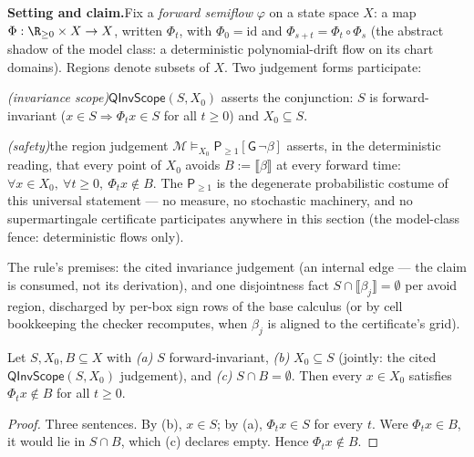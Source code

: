 

\textbf{Setting and claim.}\enspace Fix a \emph{forward semiflow} $\varphi$
on a state space $X$: a map $\Phi : \R_{\geq 0} \times X \to X$, written
$\Phi_t$, with $\Phi_0 = \mathrm{id}$ and $\Phi_{s+t} = \Phi_t \circ
\Phi_s$ (the abstract shadow of the model class: a deterministic
polynomial-drift flow on its chart domains). Regions denote subsets of
$X$. Two judgement forms participate:

\emph{(invariance scope)}\enspace $\mathsf{QInvScope}(S, X_0)$ asserts the
conjunction: $S$ is forward-invariant ($x \in S \Rightarrow \Phi_t x \in S$
for all $t \geq 0$) and $X_0 \subseteq S$.

\emph{(safety)}\enspace the region judgement
$\mathcal{M} \vDash_{X_0} \mathsf{P}_{\geq 1}[\mathsf{G}\,\neg\beta]$
asserts, in the deterministic reading, that every point of $X_0$ avoids
$B := \llbracket\beta\rrbracket$ at every forward time:
$\forall x \in X_0,\ \forall t \geq 0,\ \Phi_t x \notin B$. The
$\mathsf{P}_{\geq 1}$ is the degenerate probabilistic costume of this
universal statement --- no measure, no stochastic machinery, and no
supermartingale certificate participates anywhere in this section (the
model-class fence: deterministic flows only).

The rule's premises: the cited invariance judgement (an internal edge ---
the claim is consumed, not its derivation), and one disjointness fact
$S \cap \llbracket\beta_j\rrbracket = \emptyset$ per avoid region,
discharged by per-box sign rows of the base calculus (or by cell
bookkeeping the checker recomputes, when $\beta_j$ is aligned to the
certificate's grid).

\begin{bthm}\label{thm:qbasin-sound}
Let $S, X_0, B \subseteq X$ with
\emph{(a)} $S$ forward-invariant,
\emph{(b)} $X_0 \subseteq S$
(jointly: the cited $\mathsf{QInvScope}(S, X_0)$ judgement), and
\emph{(c)} $S \cap B = \emptyset$.
Then every $x \in X_0$ satisfies $\Phi_t x \notin B$ for all
$t \geq 0$.
\end{bthm}
\begin{proof}
Three sentences. By (b), $x \in S$; by (a), $\Phi_t x \in S$ for every
$t$. Were $\Phi_t x \in B$, it would lie in $S \cap B$, which (c)
declares empty. Hence $\Phi_t x \notin B$.
\end{proof}

